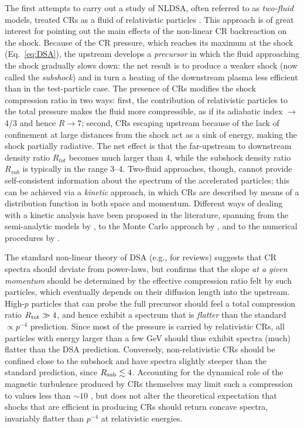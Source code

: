 \documentclass[varenna]{cimento}
\newcommand{\Rs}{R_{sub}}
\newcommand{\Rt}{R_{tot}}
\newcommand{\rt}{R_{\rm tot}}
\newcommand{\rs}{R_{\rm sub}}
\begin{document}
The first attempts to carry out a study of NLDSA, often referred to as \emph{two-fluid} models, treated CRs as a fluid of relativistic particles \cite{axford+78,drury+81a,drury+81b}.
This approach is of great interest for pointing out the main effects of the non-linear CR backreaction on the shock.
Because of the CR pressure, which reaches its maximum at the shock (Eq.~\ref{eq:DSA}), the upstream develops a \emph{precursor} in which the fluid approaching the shock gradually slows down: 
the net result is to produce a weaker shock (now called the \emph{subshock}) and in turn a heating of the downstream plasma less efficient than in the test-particle case.
The presence of CRs  modifies the shock compression ratio in two ways: 
first, the contribution of relativistic particles to the total pressure makes the fluid more compressible, as if its adiabatic index $\to $ 4/3 and hence $R\to 7$; 
second, CRs escaping upstream because of the lack of confinement at large distances from the shock  act as a sink of energy, making the shock partially radiative. 
The net effect is that the far-upstream to downstream density ratio $\Rt$ becomes much larger than 4, while the subshock density ratio $\Rs$ is typically in the range 3--4.
Two-fluid approaches, though, cannot provide self-consistent information about the spectrum of the accelerated particles; 
this can be achieved via a \emph{kinetic} approach, in which CRs are described by means of a distribution function in both space and momentum.
Different ways of dealing with a kinetic analysis have been proposed in the literature, spanning from the semi-analytic models by \cite{malkov97,malkov+00,blasi02,blasi04,amato+05,amato+06,caprioli+10a,caprioli12}, to the Monte Carlo approach by \cite{ellison+85a,ellison+90,jones+91,ellison+95,ellison+96,vladimirov+06}, and to the numerical procedures by \cite{bell87,falle-giddings87,kang+97,kang+05,kang+06,kang+07,berezhko+99,kang13,kang+18}. 

The standard non-linear theory of DSA (e.g., \cite{jones+91,malkov+01} for reviews) suggests that CR spectra should deviate from power-laws, but confirms that the slope \emph{at a given momentum} should be determined by the effective compression ratio felt by such particles, which eventually depends on their diffusion length into the upstream.
High-$p$ particles that can probe the full precursor should feel a total compression ratio $\rt\gg 4$, and hence exhibit a spectrum that is \emph{flatter} than the standard $\propto p^{-4}$ prediction.
Since most of the pressure is carried by relativistic CRs, all particles with energy larger than a few GeV should thus exhibit spectra (much) flatter than the DSA prediction.
Conversely, non-relativistic CRs should be confined close to the subshock and have spectra slightly steeper than the standard prediction, since $\rs\lesssim 4$.
Accounting for the dynamical role of the magnetic turbulence produced by CRs themselves may limit such a compression to values less than $\sim 10$ \cite{caprioli+08, caprioli+09a}, but does not alter the theoretical expectation that shocks that are efficient in producing CRs should return concave spectra, invariably flatter than $p^{-4}$ at relativistic energies.
\end{document}
